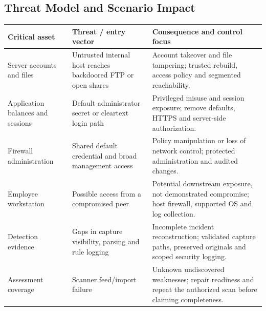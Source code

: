 \documentclass[11pt,a4paper]{article}
\begin{document}
\subsection{Threat Model and Scenario Impact}
\begin{tabularx}{\linewidth}{@{}L{2.7cm}L{3.4cm}X@{}}
\toprule
\textbf{Critical asset} & \textbf{Threat / entry vector} & \textbf{Consequence and control focus}\\
\midrule
Server accounts and files & Untrusted internal host reaches backdoored FTP or open shares & Account takeover and file tampering; trusted rebuild, access policy and segmented reachability.\\
Application balances and sessions & Default administrator secret or cleartext login path & Privileged misuse and session exposure; remove defaults, HTTPS and server-side authorization.\\
Firewall administration & Shared default credential and broad management access & Policy manipulation or loss of network control; protected administration and audited changes.\\
Employee workstation & Possible access from a compromised peer & Potential downstream exposure, not demonstrated compromise; host firewall, supported OS and log collection.\\
Detection evidence & Gaps in capture visibility, parsing and rule logging & Incomplete incident reconstruction; validated capture paths, preserved originals and scoped security logging.\\
Assessment coverage & Scanner feed/import failure & Unknown undiscovered weaknesses; repair readiness and repeat the authorized scan before claiming completeness.\\
\bottomrule
\end{tabularx}

\begin{center}
\end{center}
\end{document}

